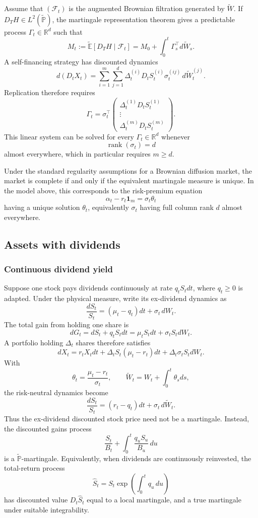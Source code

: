 Assume that $(\mathcal{F}_t)$ is the augmented Brownian filtration generated by $\widetilde W$. If $D_TH\in L^2(\widetilde{\mathbb{P}})$, the martingale representation theorem gives a predictable process $\Gamma_t\in\mathbb{R}^d$ such that
\[
M_t:=\widetilde{\mathbb{E}}[D_TH\mid\mathcal{F}_t]
=M_0+\int_0^t\Gamma_s^\top d\widetilde W_s.
\]
A self-financing strategy has discounted dynamics
\[
d(D_tX_t)
=\sum_{i=1}^m\sum_{j=1}^d
 \Delta_t^{(i)}D_tS_t^{(i)}\sigma_t^{(ij)}
 \,d\widetilde W_t^{(j)}.
\]
Replication therefore requires
\[
\Gamma_t
=\sigma_t^\top
\begin{pmatrix}
\Delta_t^{(1)}D_tS_t^{(1)}\\
\vdots\\
\Delta_t^{(m)}D_tS_t^{(m)}
\end{pmatrix}.
\]
This linear system can be solved for every $\Gamma_t\in\mathbb{R}^d$ whenever
\[
\operatorname{rank}(\sigma_t)=d
\]
almost everywhere, which in particular requires $m\geq d$.

\begin{thm}
Under the standard regularity assumptions for a Brownian diffusion market, the market is complete if and only if the equivalent martingale measure is unique. In the model above, this corresponds to the risk-premium equation
\[
\alpha_t-r_t\mathbf{1}_m=\sigma_t\theta_t
\]
having a unique solution $\theta_t$, equivalently $\sigma_t$ having full column rank $d$ almost everywhere.
\end{thm}

\subsection{Assets with dividends}

\subsubsection*{Continuous dividend yield}

Suppose one stock pays dividends continuously at rate $q_tS_tdt$, where $q_t\geq0$ is adapted. Under the physical measure, write its ex-dividend dynamics as
\[
\frac{dS_t}{S_t}=(\mu_t-q_t)dt+\sigma_t\,dW_t.
\]
The total gain from holding one share is
\[
dG_t=dS_t+q_tS_tdt
     =\mu_tS_tdt+\sigma_tS_tdW_t.
\]
A portfolio holding $\Delta_t$ shares therefore satisfies
\[
dX_t
=r_tX_tdt+\Delta_tS_t(\mu_t-r_t)dt
 +\Delta_t\sigma_tS_tdW_t.
\]
With
\[
\theta_t=\frac{\mu_t-r_t}{\sigma_t},
\qquad
\widetilde W_t=W_t+\int_0^t\theta_sds,
\]
the risk-neutral dynamics become
\[
\boxed{\frac{dS_t}{S_t}=(r_t-q_t)dt+\sigma_t\,d\widetilde W_t.}
\]
Thus the ex-dividend discounted stock price need not be a martingale. Instead, the discounted gains process
\[
\frac{S_t}{B_t}+\int_0^t\frac{q_uS_u}{B_u}\,du
\]
is a $\widetilde{\mathbb{P}}$-martingale. Equivalently, when dividends are continuously reinvested, the total-return process
\[
\widehat S_t=S_t\exp\!\left(\int_0^tq_u\,du\right)
\]
has discounted value $D_t\widehat S_t$ equal to a local martingale, and a true martingale under suitable integrability.

